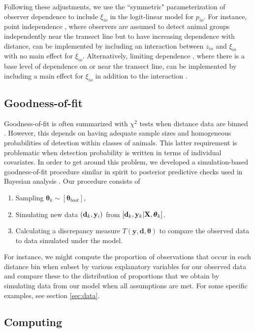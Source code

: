\documentclass[12pt,fleqn]{article}
\begin{document}
Following these adjustments, we use the ``symmetric" parameterization \citep{MacKenzieClement2016} of observer dependence to include $\xi_{io}$ in the logit-linear model for $p_{io}$.  For instance, point independence \citep{LaakeBorchers2004,BucklandEtAl2010}, where observers are assumed to detect animal groups independently near the transect line but to have increasing dependence with distance, can be implemented by including an interaction between $z_{io}$ and $\xi_{io}$ with no main effect for $\xi_{io}$.  Alternatively, limiting dependence \citep{BucklandEtAl2010}, where there is a base level of dependence on or near the transect line, can be implemented by including a main effect for $\xi_{io}$ in addition to the interaction \citep{MacKenzieClement2016}.

\subsection{Goodness-of-fit}

Goodness-of-fit is often summarized with $\chi^2$ tests when distance data are binned \citep{BurnhamEtAl2004}.  However, this depends on having adequate sample sizes and homogeneous probabilities of detection within classes of animals. This latter requirement is problematic when detection probability is written in terms of individual covariates.  In order to get around this problem, we developed a simulation-based goodness-of-fit procedure similar in spirit to posterior predictive checks used in Bayesian analysis \citep[e.g.][]{GelmanEtAl2014}.  Our procedure consists of
\begin{enumerate}
  \item Sampling $\boldsymbol{\theta}_k \sim [\boldsymbol{\theta}_{boot}]$,
  \item Simulating new data $({\bf d}_k, {\bf y}_i)$ from $[{\bf d}_k,{\bf y}_k | {\bf X},\boldsymbol{\theta}_k]$.
  \item Calculating a discrepancy measure $T(\textbf{y},\textbf{d},\boldsymbol{\theta})$ to compare the observed data to data simulated under the model.
\end{enumerate}
For instance, we might compute the proportion of observations that occur in each distance bin when subset by various explanatory variables for our observed data and compare these to the distribution of proportions that we obtain by simulating data from our model when all assumptions are met.  For some specific examples, see section \ref{sec:data}.

\subsection{Computing}
\end{document}
